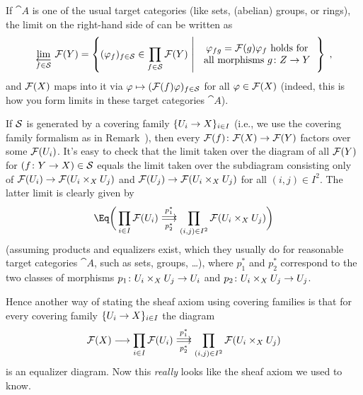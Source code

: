 \documentclass[a4paper,parskip=half,numbers=enddot, DIV=12]{scrreprt}
\begin{document}
\begin{rem}
	\begin{alphanumerate}
		\item {}If $\cat A$ is one of the usual target categories (like sets, (abelian) groups, or rings), the limit on the right-hand side of  can be written as
		\begin{align*}
			\limit[f\in\Ss]\Ff(Y)=\left\{(\phi_f)_{f\in\Ss}\in\prod_{f\in\Ss}\Ff(Y)\st
			\begin{tabular}{c}
				$\phi_{fg}=\Ff(g)\phi_f$ holds for\\
				all morphisms $g\colon Z\to Y$
			\end{tabular} \right\}\;,
		\end{align*}
		and $\mathcal{F}(X)$ maps into it via $\varphi\mapsto (\mathcal{F}(f)\varphi)_{f\in\mathcal{S}}$ for all $\varphi\in\mathcal{F}(X)$ (indeed, this is how you form limits in these target categories $\cat A$).
		\item If $\mathcal{S}$ is generated by a covering family $\{U_i\morphism X\}_{i\in I}$ (i.e., we use the covering family formalism as in Remark~), then every $\Ff(f)\colon \Ff(X)\morphism \Ff(Y)$ factors over some $\mathcal{F}(U_i)$. It's easy to check that the limit taken over the diagram of all $\mathcal{F}(Y)$ for $(f\colon Y\morphism X)\in\Ss$ equals the limit taken over the subdiagram consisting only of $\Ff(U_i)\morphism\Ff(U_i\times_XU_j)$ and $\Ff(U_j)\morphism\Ff(U_i\times_XU_j)$ for all $(i,j)\in I^2$. The latter limit is clearly given by
		\begin{align*}
			\Eq\bigg(\prod_{i\in I}\Ff(U_i)\doublemorphism[ p_1^*][ p_2^*]\prod_{(i,j)\in I^2}\Ff(U_i\times_XU_j)\bigg)
		\end{align*}
		(assuming products and equalizers exist, which they usually do for reasonable target categories $\cat A$, such as sets, groups, \ldots), where $ p_1^*$ and $ p_2^*$ correspond to the two classes of morphisms $ p_1\colon U_i\times_XU_j\morphism U_ i$ and $ p_2\colon U_i\times_XU_j\morphism U_j$.
		
		Hence another way of stating the sheaf axiom using covering families is that for every covering family $\{U_i\morphism X\}_{i\in I}$ the diagram
		\begin{align*}
			\Ff(X)\morphism\prod_{i\in I}\Ff(U_i)\doublemorphism[ p_1^*][ p_2^*]\prod_{(i,j)\in I^2}\Ff(U_i\times_XU_j)
		\end{align*}
		is an equalizer diagram. Now this \emph{really} looks like the sheaf axiom we used to know.
	\end{alphanumerate}
\end{rem}
\end{document}
